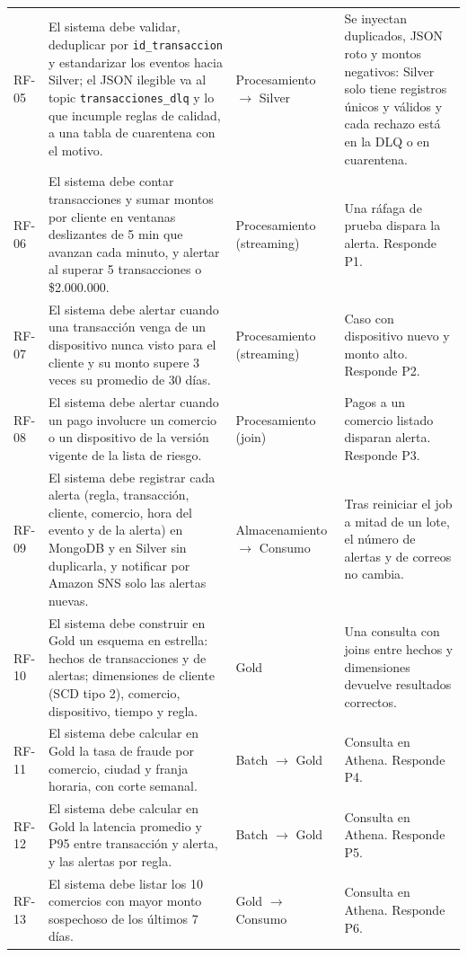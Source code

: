 \documentclass[12pt,letterpaper]{article}
\newcommand{\code}[1]{{\small\texttt{#1}}}
\begin{document}
\begin{footnotesize}
\begin{longtable}{@{}P{0.45in}P{2.85in}P{0.95in}P{2.05in}@{}}
RF-05 & El sistema debe validar, deduplicar por \code{id\_transaccion} y estandarizar los eventos hacia Silver; el JSON ilegible va al topic \code{transacciones\_dlq} y lo que incumple reglas de calidad, a una tabla de cuarentena con el motivo. & Procesamiento $\rightarrow$ Silver & Se inyectan duplicados, JSON roto y montos negativos: Silver solo tiene registros únicos y válidos y cada rechazo está en la DLQ o en cuarentena.\\[1pt]
RF-06 & El sistema debe contar transacciones y sumar montos por cliente en ventanas deslizantes de 5 min que avanzan cada minuto, y alertar al superar 5 transacciones o \$2.000.000. & Procesamiento (streaming) & Una ráfaga de prueba dispara la alerta. Responde P1.\\[1pt]
RF-07 & El sistema debe alertar cuando una transacción venga de un dispositivo nunca visto para el cliente y su monto supere 3 veces su promedio de 30 días. & Procesamiento (streaming) & Caso con dispositivo nuevo y monto alto. Responde P2.\\[1pt]
RF-08 & El sistema debe alertar cuando un pago involucre un comercio o un dispositivo de la versión vigente de la lista de riesgo. & Procesamiento (join) & Pagos a un comercio listado disparan alerta. Responde P3.\\[1pt]
RF-09 & El sistema debe registrar cada alerta (regla, transacción, cliente, comercio, hora del evento y de la alerta) en MongoDB y en Silver sin duplicarla, y notificar por Amazon SNS solo las alertas nuevas. & Almacenamiento $\rightarrow$ Consumo & Tras reiniciar el job a mitad de un lote, el número de alertas y de correos no cambia.\\[1pt]
RF-10 & El sistema debe construir en Gold un esquema en estrella: hechos de transacciones y de alertas; dimensiones de cliente (SCD tipo 2), comercio, dispositivo, tiempo y regla. & Gold & Una consulta con joins entre hechos y dimensiones devuelve resultados correctos.\\[1pt]
RF-11 & El sistema debe calcular en Gold la tasa de fraude por comercio, ciudad y franja horaria, con corte semanal. & Batch $\rightarrow$ Gold & Consulta en Athena. Responde P4.\\[1pt]
RF-12 & El sistema debe calcular en Gold la latencia promedio y P95 entre transacción y alerta, y las alertas por regla. & Batch $\rightarrow$ Gold & Consulta en Athena. Responde P5.\\[1pt]
RF-13 & El sistema debe listar los 10 comercios con mayor monto sospechoso de los últimos 7 días. & Gold $\rightarrow$ Consumo & Consulta en Athena. Responde P6.\\[1pt]

\end{longtable}
\end{footnotesize}
\end{document}
